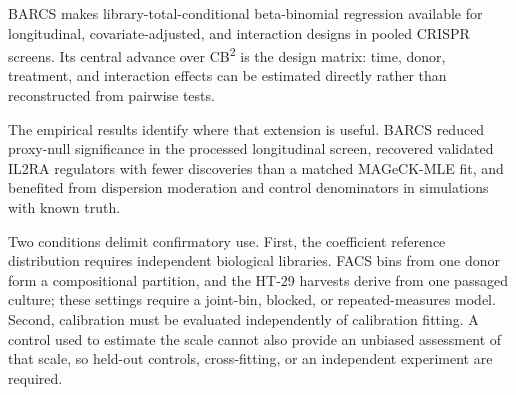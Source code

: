 BARCS makes library-total-conditional beta-binomial regression available for
longitudinal, covariate-adjusted, and interaction designs in pooled CRISPR
screens.  Its central advance over CB\textsuperscript{2} is the design matrix:
time, donor, treatment, and interaction effects can be estimated directly
rather than reconstructed from pairwise tests.

The empirical results identify where that extension is useful.  BARCS reduced
proxy-null significance in the processed longitudinal screen, recovered
validated IL2RA regulators with fewer discoveries than a matched MAGeCK-MLE
fit, and benefited from dispersion moderation and control denominators in
simulations with known truth.

Two conditions delimit confirmatory use.  First, the coefficient reference
distribution requires independent biological libraries.  FACS bins from one
donor form a compositional partition, and the HT-29 harvests derive from one
passaged culture; these settings require a joint-bin, blocked, or
repeated-measures model.  Second, calibration must be evaluated independently
of calibration fitting.  A control used to estimate the scale cannot also
provide an unbiased assessment of that scale, so held-out controls,
cross-fitting, or an independent experiment are required.
